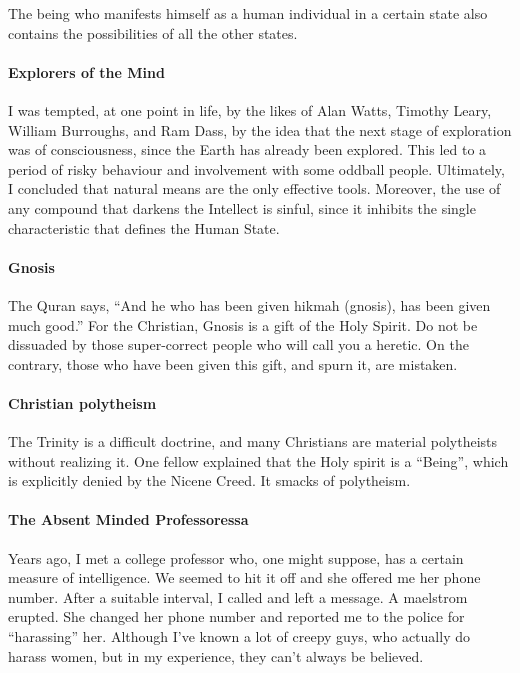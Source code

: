 \begin{quotex}
The being who manifests himself as a human individual in a certain state also contains the possibilities of all the other states.
\end{quotex}


\paragraph{Explorers of the Mind} I was tempted, at one point in life, by the likes of Alan Watts, Timothy Leary, William Burroughs, and Ram Dass, by the idea that the next stage of exploration was of consciousness, since the Earth has already been explored. This led to a period of risky behaviour and involvement with some oddball people. Ultimately, I concluded that natural means are the only effective tools. Moreover, the use of any compound that darkens the Intellect is sinful, since it inhibits the single characteristic that defines the Human State.

\paragraph{Gnosis} The Quran says, ``And he who has been given hikmah (gnosis), has been given much good.'' For the Christian, Gnosis is a gift of the Holy Spirit. Do not be dissuaded by those super-correct people who will call you a heretic. On the contrary, those who have been given this gift, and spurn it, are mistaken.

\paragraph{Christian polytheism} The Trinity is a difficult doctrine, and many Christians are material polytheists without realizing it. One fellow explained that the Holy spirit is a ``Being'', which is explicitly denied by the Nicene Creed. It smacks of polytheism.

\paragraph{The Absent Minded Professoressa} Years ago, I met a college professor who, one might suppose, has a certain measure of intelligence. We seemed to hit it off and she offered me her phone number. After a suitable interval, I called and left a message. A maelstrom erupted. She changed her phone number and reported me to the police for ``harassing'' her. Although I've known a lot of creepy guys, who actually do harass women, but in my experience, they can't always be believed.

